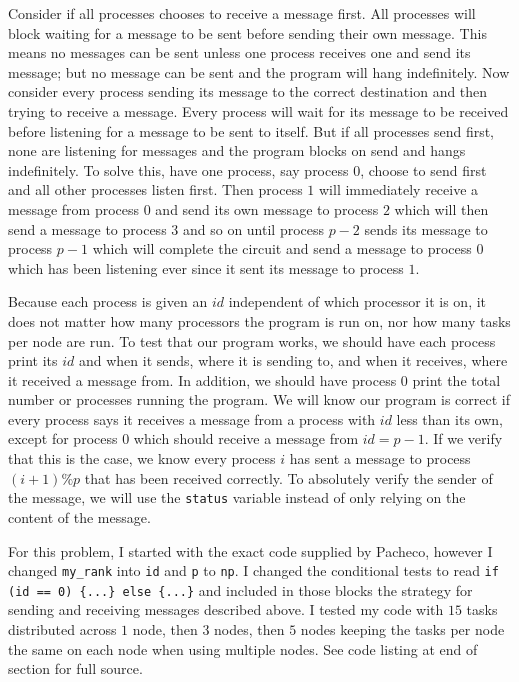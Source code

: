\documentclass[11pt]{article}
\begin{document}
Consider if all processes chooses to receive a message first. All processes will block waiting for a message to be sent before sending their own message. This means no messages can be sent unless one process receives one and send its message; but no message can be sent and the program will hang indefinitely. Now consider every process sending its message to the correct destination and then trying to receive a message. Every process will wait for its message to be received before listening for a message to be sent to itself. But if all processes send first, none are listening for messages and the program blocks on send and hangs indefinitely. To solve this, have one process, say process $0$, choose to send first and all other processes listen first. Then process $1$ will immediately receive a message from process $0$ and send its own message to process $2$ which will then send a message to process $3$ and so on until process $p-2$ sends its message to process $p-1$ which will complete the circuit and send a message to process $0$ which has been listening ever since it sent its message to process $1$.

Because each process is given an $id$ independent of which processor it is on, it does not matter how many processors the program is run on, nor how many tasks per node are run. To test that our program works, we should have each process print its $id$ and when it sends, where it is sending to, and when it receives, where it received a message from. In addition, we should have process $0$ print the total number or processes running the program. We will know our program is correct if every process says it receives a message from a process with $id$ less than its own, except for process $0$ which should receive a message from $id=p-1$. If we verify that this is the case, we know every process $i$ has sent a message to process $(i+1)\%p$ that has been received correctly. To absolutely verify the sender of the message, we will use the \texttt{status} variable instead of only relying on the content of the message.

For this problem, I started with the exact code supplied by Pacheco, however I changed \texttt{my\_rank} into \texttt{id} and \texttt{p} to \texttt{np}. I changed the conditional tests to read \texttt{if (id == 0) \{...\} else \{...\}} and included in those blocks the strategy for sending and receiving messages described above. I tested my code with $15$ tasks distributed across $1$ node, then $3$ nodes, then $5$ nodes keeping the tasks per node the same on each node when using multiple nodes. See code listing at end of section for full source.
\end{document}
